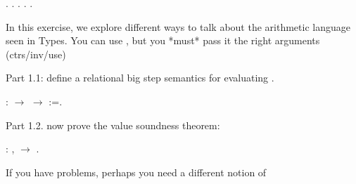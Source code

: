 \documentclass[12pt]{report}
\begin{document}

\begin{coqdoccode}
\coqdocnoindent
{}    .\coqdoceol
\coqdocnoindent
{}    .\coqdoceol
\coqdocnoindent
{}    .\coqdoceol
\coqdocnoindent
{}    .\coqdoceol
\coqdocnoindent
{} .\coqdoceol
\coqdocemptyline
\end{coqdoccode}
In this exercise, we explore different ways to talk about the
arithmetic language seen in Types. You can use , but you *must* pass it
the right arguments (ctrs/inv/use)



Part 1.1: define a relational big step semantics for evaluating  .

\begin{coqdoccode}
\coqdocemptyline
\coqdocnoindent
{}  :  \ensuremath{\rightarrow}  \ensuremath{\rightarrow}  :=.\coqdoceol
\coqdocemptyline
\end{coqdoccode}
Part 1.2. now prove the value soundness theorem:



\begin{coqdoccode}
\coqdocnoindent
{} : \coqdockw{\ensuremath{\forall}}  ,    \ensuremath{\rightarrow}  .\coqdoceol
\coqdocemptyline
\end{coqdoccode}
If you have problems, perhaps
you need a different notion of 
\end{document}
